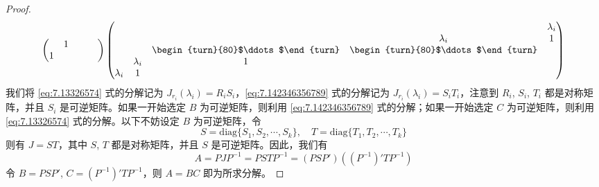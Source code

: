 \documentclass[../../main.tex]{subfiles}
\begin{document}
\begin{proof}
\begin{align}
\begin{pmatrix}
& 1 & & & \\
1 & & & &
\end{pmatrix}
\begin{pmatrix}
& & & & \lambda_i \\
& & & \lambda_i & 1 \\
& & \begin{turn}{80}$\ddots$\end{turn} & \begin{turn}{80}$\ddots$\end{turn} & \\
& \lambda_i & 1 & & \\
\lambda_i & 1 & & &
\end{pmatrix}
\label{eq:7.142346356789}
\end{align}
我们将 \eqref{eq:7.13326574} 式的分解记为 $J_{r_i}(\lambda_i) = R_iS_i$，\eqref{eq:7.142346356789} 式的分解记为 $J_{r_i}(\lambda_i) = S_iT_i$，注意到 $R_i$, $S_i$, $T_i$ 都是对称矩阵，并且 $S_i$ 是可逆矩阵。如果一开始选定 $B$ 为可逆矩阵，则利用 \eqref{eq:7.142346356789} 式的分解；如果一开始选定 $C$ 为可逆矩阵，则利用 \eqref{eq:7.13326574} 式的分解。以下不妨设定 $B$ 为可逆矩阵，令
\[
S = \mathrm{diag}\{S_1,S_2,\cdots,S_k\}, \quad T = \mathrm{diag}\{T_1,T_2,\cdots,T_k\}
\]
则有 $J = ST$，其中 $S$, $T$ 都是对称矩阵，并且 $S$ 是可逆矩阵。因此，我们有
\[
A = PJP^{-1} = PSTP^{-1} = (PSP')((P^{-1})'TP^{-1})
\]
令 $B = PSP'$, $C = (P^{-1})'TP^{-1}$，则 $A = BC$ 即为所求分解。
\end{proof}
\end{document}
